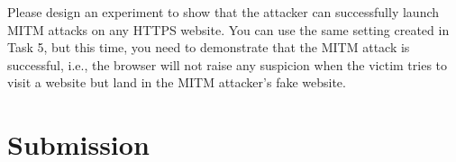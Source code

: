 Please design an experiment to show that the attacker can successfully launch MITM attacks on
any HTTPS website. You can use the same setting created in Task 5, but this time, you need to
demonstrate that the MITM attack is successful, i.e., the browser will not 
raise any suspicion when the victim tries to visit a website but land in the MITM attacker's
fake website.



\section{Submission}






